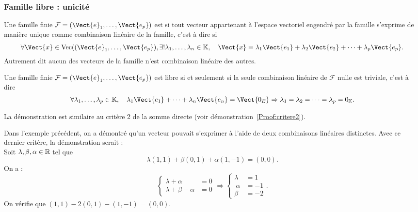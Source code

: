 \documentclass{book}
\begin{document}
\subsubsection{Famille libre : unicité}
\begin{Definition}
Une famille finie  $\mathcal{F}=(\Vect{e}_1,\dots,\Vect{e_p})$ est  si tout vecteur appartenant à l'espace vectoriel engendré par la famille s'exprime de manière unique comme combinaison linéaire de la famille, c'est à dire si 
\[ \forall \Vect{x} \in \operatorname{Vec} ((\Vect{e}_1,\dots,\Vect{e_p}),\exists ! \lambda_1,\dots,\lambda_n \in \K,\quad \Vect{x} = \lambda_1 \Vect{e_1}+ \lambda_2 \Vect{e_2}+\dots +\lambda_p \Vect{e_p}. \]
Autrement dit aucun des vecteurs de la famille n'est combinaison linéaire des autres.
\end{Definition}
\begin{Proposition}[Critère]
Une famille finie  $\mathcal{F}=(\Vect{e}_1,\dots,\Vect{e_p})$ est libre si et seulement si la seule combinaison linéaire de $\mathcal{F}$ nulle est triviale, c'est à dire
$$ \forall \lambda_1,\dots,\lambda_p   \in \K,\quad  \lambda _1 \Vect{e_1}+\dots+\lambda _n \Vect{e_n} = \Vect{0_E} \Rightarrow \lambda _1=\lambda _2=\dots=\lambda_p= 0_\K  .$$
\end{Proposition}
\begin{Demonstration}
La démonstration est similaire au critère 2 de la somme directe (voir démonstration~\ref{Proof:critere2}).
\end{Demonstration}
\begin{Exemple}
Dans l'exemple précédent, on a démontré qu'un vecteur pouvait s'exprimer à l'aide de deux combinaisons linéaires distinctes. Avec ce dernier critère, la démonstration serait :\\
Soit $\lambda,\beta,\alpha \in \mathbb{R}$ tel que $$\lambda (1,1) + \beta  (0,1) + \alpha (1,-1)    =(0,0).$$
On a : 
$$ \begin{cases}\lambda +\alpha &=0\\\lambda+\beta-\alpha&=0\end{cases}\Rightarrow \begin{cases}\lambda &=1\\\ \alpha&=-1\\ \beta&=-2 \end{cases}.$$
On vérifie que $(1,1)-2(0,1)- (1,-1) =(0,0)$.
\end{Exemple}
\end{document}
